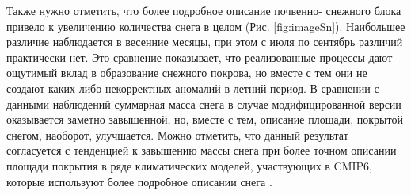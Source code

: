 \documentclass[a4paper, fontsize=14pt]{scrartcl}
\begin{document}
Также нужно отметить, что более подробное описание почвенно- снежного блока привело к увеличению количества снега в целом (Рис. \ref{fig:imageSn}). Наибольшее различие наблюдается в весенние месяцы, при этом с июля по сентябрь различий практически нет. Это сравнение показывает, что реализованные процессы дают ощутимый вклад в образование снежного покрова, но вместе с тем они не создают каких-либо некорректных аномалий в летний период.  В сравнении с данными наблюдений суммарная масса снега в случае модифицированной версии оказывается заметно завышенной, но, вместе с тем, описание площади, покрытой снегом, наоборот, улучшается. Можно отметить, что данный результат согласуется с тенденцией к завышению массы снега при более точном описании площади покрытия в ряде климатических моделей, участвующих в CMIP6, которые используют более подробное описании снега \cite{Mudryk2020}.
\end{document}
